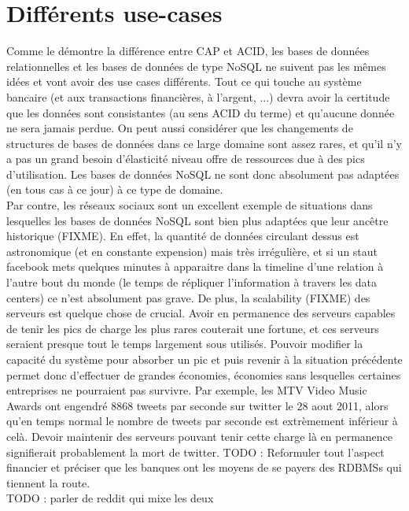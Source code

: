 \documentclass[11pt]{article}
\begin{document}
\section{Différents use-cases}
Comme le démontre la différence entre CAP et ACID, les bases de données relationnelles et les bases de données de type NoSQL ne suivent pas les mêmes idées et vont avoir des use cases différents. Tout ce qui touche au système bancaire (et aux transactions financières, à l'argent, ...) devra avoir la certitude que les données sont consistantes (au sens ACID du terme) et qu'aucune donnée ne sera jamais perdue. On peut aussi considérer que les changements de structures de bases de données dans ce large domaine sont assez rares, et qu'il n'y a pas un grand besoin d'élasticité niveau offre de ressources due à des pics d'utilisation. Les bases de données NoSQL ne sont donc absolument pas adaptées (en tous cas à ce jour) à ce type de domaine. \\
Par contre, les réseaux sociaux sont un excellent exemple de situations dans lesquelles les bases de données NoSQL sont bien plus adaptées que leur ancêtre historique (FIXME). En effet, la quantité de données circulant dessus est astronomique (et en constante expension) mais très irrégulière, et si un staut facebook mets quelques minutes à apparaitre dans la timeline d'une relation à l'autre bout du monde (le temps de répliquer l'information à travers les data centers) ce n'est absolument pas grave. De plus, la scalability (FIXME) des serveurs est quelque chose de crucial. Avoir en permanence des serveurs capables de tenir les pics de charge les plus rares couterait une fortune, et ces serveurs seraient presque tout le temps largement sous utilisés. Pouvoir modifier la capacité du système pour absorber un pic et puis revenir à la situation précédente permet donc d'effectuer de grandes économies, économies sans lesquelles certaines entreprises ne pourraient pas survivre. Par exemple, les MTV Video Music Awards ont engendré 8868 tweets par seconde sur twitter le 28 aout 2011, alors qu'en temps normal le nombre de tweets par seconde est extrèmement inférieur à celà. Devoir maintenir des serveurs pouvant tenir cette charge là en permanence signifierait probablement la mort de twitter. TODO : Reformuler tout l'aspect financier et préciser que les banques ont les moyens de se payers des RDBMSs qui tiennent la route. \\
TODO : parler de reddit qui mixe les deux
\end{document}
